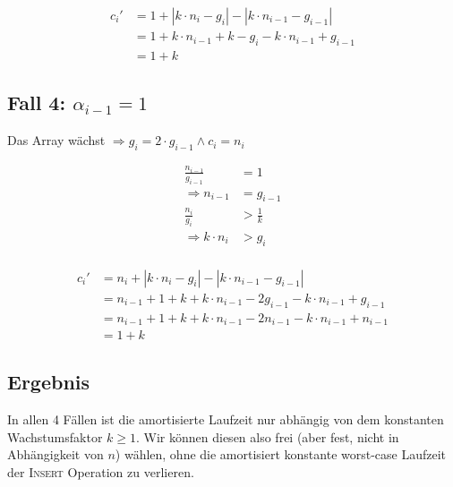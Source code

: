 \documentclass[parskip=half,a4paper]{scrartcl}
\begin{document}
\begin{equation}
\begin{aligned}
   c_i' &= 1 + \left|k \cdot n_i - g_i\right| - \left|k \cdot n_{i-1} - g_{i-1}\right|\\
   &= 1 + k \cdot n_{i-1} + k - g_i - k \cdot n_{i-1} + g_{i-1}\\
   &= 1 + k
\end{aligned}
\end{equation}

\subsection*{Fall 4: $\alpha_{i-1} = 1$}

Das Array wächst
$\Rightarrow g_i = 2 \cdot g_{i-1} \land c_i = n_i$

\begin{equation}
\begin{aligned}
\frac{n_{i-1}}{g_{i-1}} &= 1 \\
 \Rightarrow n_{i-1} &= g_{i-1}\\
\frac{n_{i}}{g_{i}} &> \frac{1}{k} \\
 \Rightarrow k \cdot n_{i} &> g_{i}\\
\end{aligned}
\end{equation}



\begin{equation}
\begin{aligned}
   c_i' &= n_i + \left|k \cdot n_i - g_i\right| - \left|k \cdot n_{i-1} - g_{i-1}\right|\\
   &= n_{i-1} + 1 + k + k \cdot n_{i-1} - 2 g_{i-1} - k \cdot n_{i-1} + g_{i-1}\\
   &= n_{i-1} + 1 + k + k \cdot n_{i-1} - 2 n_{i-1} - k \cdot n_{i-1} + n_{i-1}\\
   &= 1 + k
\end{aligned}
\end{equation}

\subsection*{Ergebnis}

In allen 4 Fällen ist die amortisierte Laufzeit nur abhängig von dem konstanten Wachstumsfaktor $k \ge 1$. Wir können diesen also frei (aber fest, nicht in Abhängigkeit von $n$) wählen, ohne die amortisiert konstante worst-case Laufzeit der \textsc{Insert} Operation zu verlieren.
\end{document}
